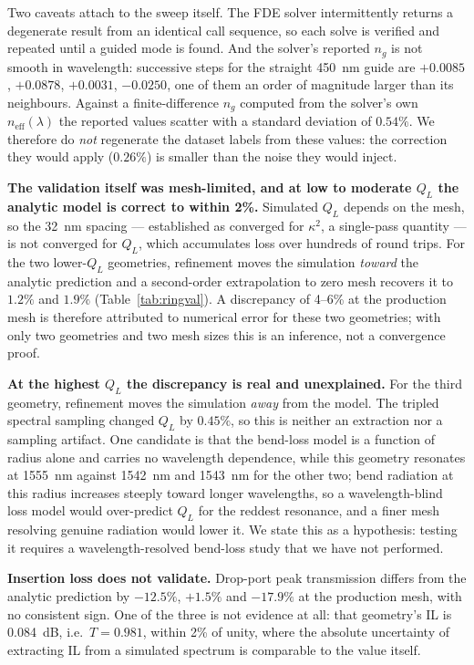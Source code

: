 \documentclass[11pt]{article}
\newcommand{\QL}{Q_L}
\begin{document}
Two caveats attach to the sweep itself. The FDE solver intermittently returns
a degenerate result from an identical call sequence, so each solve is
verified and repeated until a guided mode is found. And the solver's reported
$n_g$ is not smooth in wavelength: successive steps for the straight
\SI{450}{nm} guide are $+0.0085$, $+0.0878$, $+0.0031$, $-0.0250$, one of
them an order of magnitude larger than its neighbours. Against a
finite-difference $n_g$ computed from the solver's own $n_{\mathrm{eff}}(\lambda)$
the reported values scatter with a standard deviation of $0.54\%$. We
therefore do \emph{not} regenerate the dataset labels from these values: the
correction they would apply ($0.26\%$) is smaller than the noise they would
inject.

\textbf{The validation itself was mesh-limited, and at low to moderate $\QL$
the analytic model is correct to within 2\%.} Simulated $\QL$ depends on the
mesh, so the \SI{32}{nm} spacing --- established as converged for $\kappa^2$,
a single-pass quantity --- is not converged for $\QL$, which accumulates loss
over hundreds of round trips. For the two lower-$\QL$ geometries, refinement
moves the simulation \emph{toward} the analytic prediction and a second-order
extrapolation to zero mesh recovers it to $1.2\%$ and $1.9\%$
(Table~\ref{tab:ringval}). A discrepancy of 4--6\% at the production mesh is
therefore attributed to numerical error for these two geometries; with only two geometries and two mesh sizes this is an inference, not a convergence proof.

\textbf{At the highest $\QL$ the discrepancy is real and unexplained.} For the
third geometry, refinement moves the simulation \emph{away} from the model.
The tripled spectral sampling changed $\QL$ by $0.45\%$, so this is neither an
extraction nor a sampling artifact. One candidate is that the bend-loss model
is a function of radius alone and carries no wavelength dependence, while this
geometry resonates at \SI{1555}{nm} against \SI{1542}{nm} and \SI{1543}{nm}
for the other two; bend radiation at this radius increases steeply toward
longer wavelengths, so a wavelength-blind loss model would over-predict $\QL$
for the reddest resonance, and a finer mesh resolving genuine radiation would
lower it. We state this as a hypothesis: testing it requires a
wavelength-resolved bend-loss study that we have not performed.

\textbf{Insertion loss does not validate.} Drop-port peak transmission differs
from the analytic prediction by $-12.5\%$, $+1.5\%$ and $-17.9\%$ at the
production mesh, with no consistent sign. One of the three is not evidence at
all: that geometry's IL is \SI{0.084}{dB}, i.e.\ $T = 0.981$, within 2\% of
unity, where the absolute uncertainty of extracting IL from a simulated
spectrum is comparable to the value itself.
\end{document}
